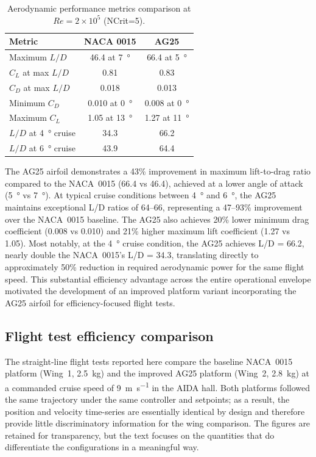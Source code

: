 \begin{table}[htbp]
\centering
\caption{Aerodynamic performance metrics comparison at $Re=2\times10^5$ (NCrit=5).}
\label{tab:airfoil_metrics}
\begin{tabular}{lcc}
\hline
\textbf{Metric} & \textbf{NACA 0015} & \textbf{AG25} \\
\hline
Maximum $L/D$ & 46.4 at \SI{7}{\degree} & 66.4 at \SI{5}{\degree} \\
$C_L$ at max $L/D$ & 0.81 & 0.83 \\
$C_D$ at max $L/D$ & 0.018 & 0.013 \\
Minimum $C_D$ & 0.010 at \SI{0}{\degree} & 0.008 at \SI{0}{\degree} \\
Maximum $C_L$ & 1.05 at \SI{13}{\degree} & 1.27 at \SI{11}{\degree} \\
$L/D$ at \SI{4}{\degree} cruise & 34.3 & 66.2 \\
$L/D$ at \SI{6}{\degree} cruise & 43.9 & 64.4 \\
\hline
\end{tabular}
\end{table}

The AG25 airfoil demonstrates a 43\% improvement in maximum lift-to-drag ratio compared to the NACA~0015 (66.4 vs 46.4), achieved at a lower angle of attack (\SI{5}{\degree} vs \SI{7}{\degree}).
At typical cruise conditions between \SI{4}{\degree} and \SI{6}{\degree}, the AG25 maintains exceptional L/D ratios of 64--66, representing a 47--93\% improvement over the NACA~0015 baseline.
The AG25 also achieves 20\% lower minimum drag coefficient (0.008 vs 0.010) and 21\% higher maximum lift coefficient (1.27 vs 1.05).
Most notably, at the \SI{4}{\degree} cruise condition, the AG25 achieves L/D = 66.2, nearly double the NACA~0015's L/D = 34.3, translating directly to approximately 50\% reduction in required aerodynamic power for the same flight speed.
This substantial efficiency advantage across the entire operational envelope motivated the development of an improved platform variant incorporating the AG25 airfoil for efficiency-focused flight tests.

\subsection{Flight test efficiency comparison}

The straight-line flight tests reported here compare the baseline NACA~0015 platform (Wing~1, \SI{2.5}{\kg}) and the improved AG25 platform (Wing~2, \SI{2.8}{\kg}) at a commanded cruise speed of \SI{9}{\meter\per\second} in the AIDA hall. Both platforms followed the same trajectory under the same controller and setpoints; as a result, the position and velocity time-series are essentially identical by design and therefore provide little discriminatory information for the wing comparison. The figures are retained for transparency, but the text focuses on the quantities that do differentiate the configurations in a meaningful way.

